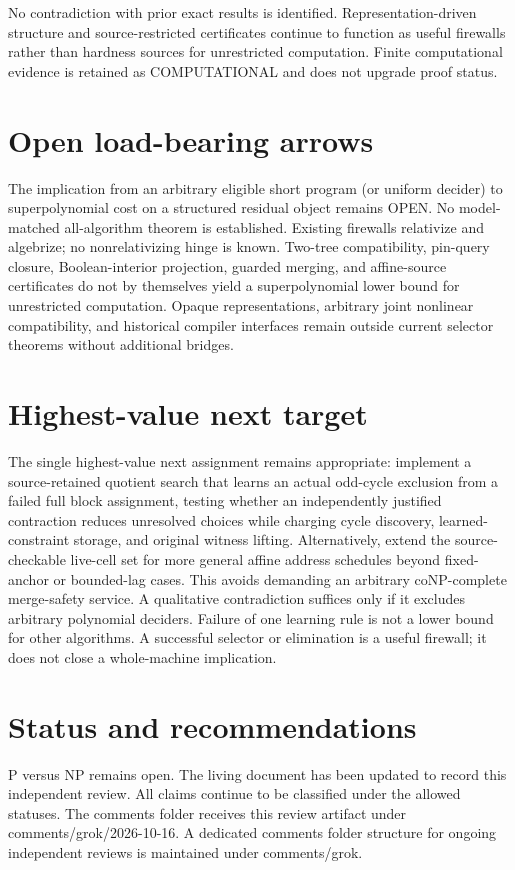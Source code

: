 \documentclass[11pt]{article}
\begin{document}
No contradiction with prior exact results is identified. Representation-driven structure and source-restricted certificates continue to function as useful firewalls rather than hardness sources for unrestricted computation. Finite computational evidence is retained as COMPUTATIONAL and does not upgrade proof status.

\section{Open load-bearing arrows}
The implication from an arbitrary eligible short program (or uniform decider) to superpolynomial cost on a structured residual object remains OPEN. No model-matched all-algorithm theorem is established. Existing firewalls relativize and algebrize; no nonrelativizing hinge is known. Two-tree compatibility, pin-query closure, Boolean-interior projection, guarded merging, and affine-source certificates do not by themselves yield a superpolynomial lower bound for unrestricted computation. Opaque representations, arbitrary joint nonlinear compatibility, and historical compiler interfaces remain outside current selector theorems without additional bridges.

\section{Highest-value next target}
The single highest-value next assignment remains appropriate: implement a source-retained quotient search that learns an actual odd-cycle exclusion from a failed full block assignment, testing whether an independently justified contraction reduces unresolved choices while charging cycle discovery, learned-constraint storage, and original witness lifting. Alternatively, extend the source-checkable live-cell set for more general affine address schedules beyond fixed-anchor or bounded-lag cases. This avoids demanding an arbitrary coNP-complete merge-safety service. A qualitative contradiction suffices only if it excludes arbitrary polynomial deciders. Failure of one learning rule is not a lower bound for other algorithms. A successful selector or elimination is a useful firewall; it does not close a whole-machine implication.

\section{Status and recommendations}
P versus NP remains open. The living document has been updated to record this independent review. All claims continue to be classified under the allowed statuses. The comments folder receives this review artifact under comments/grok/2026-10-16. A dedicated comments folder structure for ongoing independent reviews is maintained under comments/grok.

\end{document}
